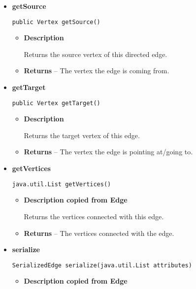 {{{{{{{{{{{{{{{{{{\begin{itemize}
{\begin{itemize}
{Returns the \texttt{\small EdgePath}{\small 
{}} of the edge. The edge path is attached to the edge and cannot be replaced.
}
\item{{\bf  Returns} -- 
the edge path 
}%
\end{itemize}
}%
\item{ 
{\bf  getSource}\\
\begin{lstlisting}[frame=none]
public Vertex getSource()\end{lstlisting} %
\begin{itemize}
\item{
{\bf  Description}

Returns the source vertex of this directed edge.
}
\item{{\bf  Returns} -- 
The vertex the edge is coming from. 
}%
\end{itemize}
}%
\item{ 
{\bf  getTarget}\\
\begin{lstlisting}[frame=none]
public Vertex getTarget()\end{lstlisting} %
\begin{itemize}
\item{
{\bf  Description}

Returns the target vertex of this edge.
}
\item{{\bf  Returns} -- 
The vertex the edge is pointing at/going to. 
}%
\end{itemize}
}%
\item{ 
{\bf  getVertices}\\
\begin{lstlisting}[frame=none]
java.util.List getVertices()\end{lstlisting} %
\begin{itemize}
\item{
{\bf  Description copied from Edge{\small {}} }

Returns the vertices connected with this edge.
}
\item{{\bf  Returns} -- 
The vertices connected with the edge. 
}%
\end{itemize}
}%
\item{ 
{\bf  serialize}\\
\begin{lstlisting}[frame=none]
SerializedEdge serialize(java.util.List attributes)\end{lstlisting} %
\begin{itemize}
\item{
{\bf  Description copied from Edge{\small {}} }

}
\end{itemize}}
\end{itemize}}}}}}}}}}}}}}}}}}}
